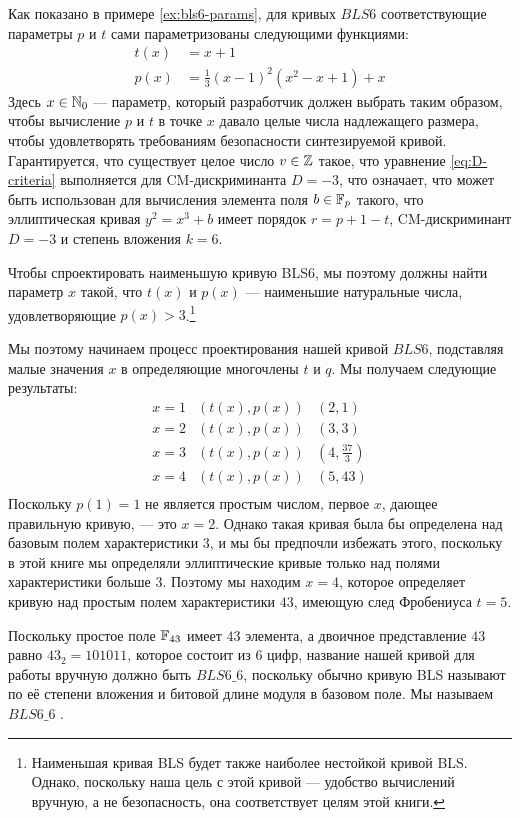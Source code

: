 Как показано в примере \ref{ex:bls6-params}, для кривых $BLS6$ соответствующие параметры $p$ и $t$ сами параметризованы следующими функциями:
\begin{equation}
\begin{split}
t(x) &= x+1\\
p(x) &= \frac{1}{3}(x-1)^2(x^{2}-x+1) +x
\end{split}
\end{equation}
Здесь $x\in\mathbb{N}_0$ — параметр, который разработчик должен выбрать таким образом, чтобы вычисление $p$ и $t$ в точке $x$ давало целые числа надлежащего размера, чтобы удовлетворять требованиям безопасности синтезируемой кривой. Гарантируется, что существует целое число $v\in\mathbb{Z}$ такое, что уравнение \ref{eq:D-criteria} выполняется для CM-дискриминанта $D=-3$, что означает, что  может быть использован для вычисления элемента поля $b\in\mathbb{F}_p$ такого, что эллиптическая кривая $y^2 = x^3 +b$ имеет порядок $r=p+1-t$, CM-дискриминант $D=-3$ и степень вложения $k=6$. 

Чтобы спроектировать наименьшую кривую BLS6, мы поэтому должны найти параметр $x$ такой, что $t(x)$ и $p(x)$ — наименьшие натуральные числа, удовлетворяющие $p(x)>3$.\footnote{Наименьшая кривая BLS будет также наиболее нестойкой кривой BLS. Однако, поскольку наша цель с этой кривой — удобство вычислений вручную, а не безопасность, она соответствует целям этой книги.}

Мы поэтому начинаем процесс проектирования нашей кривой $BLS6$, подставляя малые значения $x$ в определяющие многочлены $t$ и $q$. Мы получаем следующие результаты:
$$
\begin{array}{lcr}
x=1 & (t(x),p(x)) & (2,1)\\
x=2 & (t(x),p(x)) & (3,3)\\
x=3 & (t(x),p(x)) & (4,\frac{37}{3})\\
x=4 & (t(x),p(x)) & (5,43)\\
\end{array}
$$
Поскольку $p(1)=1$ не является простым числом, первое $x$, дающее правильную кривую, — это $x=2$. Однако такая кривая была бы определена над базовым полем характеристики $3$, и мы бы предпочли избежать этого, поскольку в этой книге мы определяли эллиптические кривые только над полями характеристики больше $3$. Поэтому мы находим $x=4$, которое определяет кривую над простым полем характеристики $43$, имеющую след Фробениуса $t=5$. 

Поскольку простое поле $\mathbb{F}_{43}$ имеет $43$ элемента, а двоичное представление $43$ равно $43_2= 101011$, которое состоит из $6$ цифр, название нашей кривой для работы вручную должно быть $BLS6\_6$, поскольку обычно кривую BLS называют по её степени вложения и битовой длине модуля в базовом поле. Мы называем $BLS6\_6$ .

